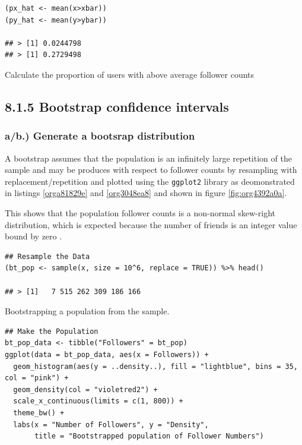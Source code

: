 \documentclass[11pt]{article}
\begin{document}
\begin{listing}[htbp]
\begin{verbatim}
(px_hat <- mean(x>xbar))
(py_hat <- mean(y>ybar))

## > [1] 0.0244798
## > [1] 0.2729498
\end{verbatim}
\caption{\label{orge1eaaef}Calculate the proportion of users with above average follower counts}
\end{listing}


\subsection{8.1.5 Bootstrap confidence intervals}
\label{sec:org62a15d1}
\subsubsection{a/b.) Generate a bootsrap distribution}
\label{sec:org6097648}

A bootstrap assumes that the population is an infinitely large repetition of the
sample and may be produces with respect to follower counts by resampling with
replacement/repetition and plotted using the \texttt{ggplot2} library as deomonstrated
in listings \ref{orga81829e} and \ref{org3048ea8} and shown in figure \ref{fig:org4392a0a}.

This shows that the population follower counts is a non-normal skew-right
distribution, which is expected because the number of friends is an integer value bound by zero \cite{nist2013}.

\begin{listing}[htbp]
\begin{verbatim}
## Resample the Data
(bt_pop <- sample(x, size = 10^6, replace = TRUE)) %>% head()

## > [1]   7 515 262 309 186 166
\end{verbatim}
\caption{\label{orga81829e}Bootstrapping a population from the sample.}
\end{listing}

\begin{listing}[htbp]
\begin{verbatim}
## Make the Population
bt_pop_data <- tibble("Followers" = bt_pop)
ggplot(data = bt_pop_data, aes(x = Followers)) +
  geom_histogram(aes(y = ..density..), fill = "lightblue", bins = 35, col = "pink") +
  geom_density(col = "violetred2") +
  scale_x_continuous(limits = c(1, 800)) +
  theme_bw() +
  labs(x = "Number of Followers", y = "Density",
       title = "Bootstrapped population of Follower Numbers")

\end{verbatim}
\label{org3048ea8}
\end{listing}
\end{document}
